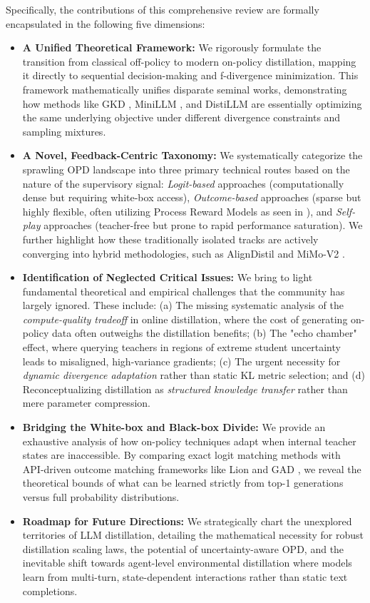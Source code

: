 \documentclass{article} %
\begin{document}
Specifically, the contributions of this comprehensive review are formally encapsulated in the following five dimensions:
\begin{itemize}
    \item \textbf{A Unified Theoretical Framework:} We rigorously formulate the transition from classical off-policy to modern on-policy distillation, mapping it directly to sequential decision-making and f-divergence minimization. This framework mathematically unifies disparate seminal works, demonstrating how methods like GKD \citep{2306.13649}, MiniLLM \citep{2306.08543}, and DistiLLM \citep{2402.03898} are essentially optimizing the same underlying objective under different divergence constraints and sampling mixtures.
    \item \textbf{A Novel, Feedback-Centric Taxonomy:} We systematically categorize the sprawling OPD landscape into three primary technical routes based on the nature of the supervisory signal: \textit{Logit-based} approaches (computationally dense but requiring white-box access), \textit{Outcome-based} approaches (sparse but highly flexible, often utilizing Process Reward Models as seen in \citet{2305.20050}), and \textit{Self-play} approaches (teacher-free but prone to rapid performance saturation). We further highlight how these traditionally isolated tracks are actively converging into hybrid methodologies, such as AlignDistil \citep{2503.02832} and MiMo-V2 \citep{2601.02780}.
    \item \textbf{Identification of Neglected Critical Issues:} We bring to light fundamental theoretical and empirical challenges that the community has largely ignored. These include: (a) The missing systematic analysis of the \textit{compute-quality tradeoff} in online distillation, where the cost of generating on-policy data often outweighs the distillation benefits; (b) The "echo chamber" effect, where querying teachers in regions of extreme student uncertainty leads to misaligned, high-variance gradients; (c) The urgent necessity for \textit{dynamic divergence adaptation} rather than static KL metric selection; and (d) Reconceptualizing distillation as \textit{structured knowledge transfer} rather than mere parameter compression.
    \item \textbf{Bridging the White-box and Black-box Divide:} We provide an exhaustive analysis of how on-policy techniques adapt when internal teacher states are inaccessible. By comparing exact logit matching methods with API-driven outcome matching frameworks like Lion \citep{2310.01382} and GAD \citep{2511.10643}, we reveal the theoretical bounds of what can be learned strictly from top-1 generations versus full probability distributions.
    \item \textbf{Roadmap for Future Directions:} We strategically chart the unexplored territories of LLM distillation, detailing the mathematical necessity for robust distillation scaling laws, the potential of uncertainty-aware OPD, and the inevitable shift towards agent-level environmental distillation where models learn from multi-turn, state-dependent interactions rather than static text completions.
\end{itemize}
\end{document}
